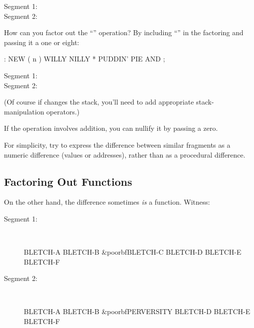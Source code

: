 \begin{description}
\item[Segment 1:] 
\item[Segment 2:] 
\end{description}

\noindent How can you factor out the ``'' operation?
By including ``\forth{*}'' in the factoring and passing it a one or eight:

\begin{Code}
: NEW  ( n )  WILLY NILLY  *  PUDDIN' PIE AND ;
\end{Code}

\begin{description}
\item[Segment 1:] 
\item[Segment 2:] 
\end{description}

\noindent 
(Of course if  changes the stack, you'll need to
add appropriate stack-manipulation operators.)

If the operation involves addition, you can nullify it by passing a
zero.

\begin{tip}
For simplicity, try to express the difference between similar
fragments as a numeric difference (values or addresses), rather than
as a procedural difference.
\end{tip}

\subsection{Factoring Out Functions}
On the other hand, the difference sometimes \emph{is} a function. Witness:

\begin{description}
\item[Segment 1:]~~
\begin{minipage}[t]{.6\hsize}
\begin{Code}[commandchars=\&\{\}]
BLETCH-A  BLETCH-B   &poorbf{BLETCH-C}
         BLETCH-D  BLETCH-E  BLETCH-F
\end{Code}
\end{minipage}
\item[Segment 2:]~~
\begin{minipage}[t]{.6\hsize}
\begin{Code}[commandchars=\&\{\}]
BLETCH-A  BLETCH-B  &poorbf{PERVERSITY}
         BLETCH-D  BLETCH-E  BLETCH-F
\end{Code}
\end{minipage}
\end{description}

